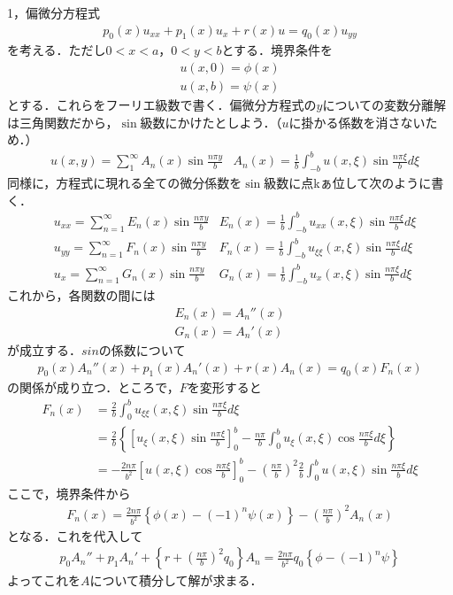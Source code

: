 \documentclass[a4j]{jarticle}
\begin{document}
1，偏微分方程式
 \begin{align*}
  p_0(x)u_{xx}+p_1(x)u_x+r(x)u=q_0(x)u_{yy}
 \end{align*}
 を考える．ただし$0<x<a$，$0<y<b$とする．境界条件を
 \begin{align*}
  u(x,0)=\phi (x)\\
  u(x,b)=\psi (x)
 \end{align*}
 とする．これらをフーリエ級数で書く．偏微分方程式の$y$についての変数分離解は三角関数だから，$\sin$級数にかけたとしよう．（$u$に掛かる係数を消さないため．）
 \begin{align*}
  &u(x,y)=\sum_{1}^{\infty}A_n(x)\sin\frac{n\pi y}{b}&A_n(x)=\frac{1}{b}\int_{-b}^{b}u(x,\xi)\sin\frac{n\pi\xi}{b}d\xi
 \end{align*}
 同様に，方程式に現れる全ての微分係数を$\sin$級数に点kぁ位して次のように書く．
\begin{align*}
 &u_{xx}=\sum_{n=1}^{\infty}E_n(x)\sin\frac{n\pi y}{b}&E_n(x)=\frac{1}{b}\int_{-b}^{b}u_{xx}(x,\xi)\sin\frac{n\pi\xi}{b}d\xi\\
 &u_{yy}=\sum_{n=1}^{\infty}F_n(x)\sin\frac{n\pi y}{b}&F_n(x)=\frac{1}{b}\int_{-b}^{b}u_{\xi \xi} (x,\xi)\sin\frac{n\pi\xi}{b}d\xi\\
  &u_{x}=\sum_{n=1}^{\infty}G_n(x)\sin\frac{n\pi y}{b}&G_n(x)=\frac{1}{b}\int_{-b}^{b}u_{x}(x,\xi)\sin\frac{n\pi\xi}{b}d\xi
\end{align*}
これから，各関数の間には
\begin{align*}
 E_n(x)=A_n''(x)\\
 G_n(x)=A_n'(x)
\end{align*}
が成立する．$sin$の係数について
\begin{align*}
 p_0(x)A_n''(x)+p_1(x)A_n'(x)+r(x)A_n(x)=q_0(x)F_n(x)
\end{align*}
の関係が成り立つ．ところで，$F$を変形すると
\begin{align*}
 F_n(x)&=\frac{2}{b}\int_{0}^{b}u_{\xi \xi} (x,\xi)\sin\frac{n\pi\xi}{b}d\xi\\
 &=\frac{2}{b}\left\{\left[u_{\xi}(x,\xi)\sin\frac{n\pi\xi}{b}\right]_{0}^{b}-\frac{n\pi}{b}\int_{0}^{b}u_{\xi}(x,\xi)\cos\frac{n\pi\xi}{b}d\xi\right\} \\
 &=-\frac{2n\pi}{b^2}\left[u(x,\xi)\cos\frac{n\pi\xi}{b}\right]_{0}^b-\left(\frac{n\pi}{b}
 \right)^2\frac{2}{b}\int_{0}^{b}u(x,\xi)\sin\frac{n\pi\xi}{b}d\xi
\end{align*}
ここで，境界条件から
\begin{align*}
 F_n(x)=\frac{2n\pi}{b^2}\left\{\phi(x)-(-1)^n\psi(x)\right\}-\left(\frac{n\pi}{b}\right)^2A_n(x)
\end{align*}
となる．これを代入して
\begin{align*}
 p_0A_n''+p_1A_n'+\left\{r+\left(\frac{n\pi}{b}\right)^2q_0\right\}A_n=\frac{2n\pi}{b^2}q_0\left\{\phi -(-1)^n\psi\right\}
\end{align*}
よってこれを$A$について積分して解が求まる．\\
\end{document}
